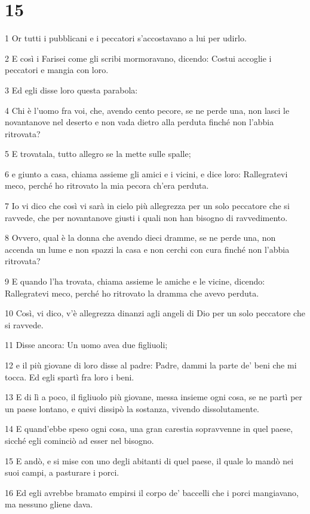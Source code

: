 \chapter{15}

\par 1 Or tutti i pubblicani e i peccatori s'accostavano a lui per udirlo.
\par 2 E così i Farisei come gli scribi mormoravano, dicendo: Costui accoglie i peccatori e mangia con loro.
\par 3 Ed egli disse loro questa parabola:
\par 4 Chi è l'uomo fra voi, che, avendo cento pecore, se ne perde una, non lasci le novantanove nel deserto e non vada dietro alla perduta finché non l'abbia ritrovata?
\par 5 E trovatala, tutto allegro se la mette sulle spalle;
\par 6 e giunto a casa, chiama assieme gli amici e i vicini, e dice loro: Rallegratevi meco, perché ho ritrovato la mia pecora ch'era perduta.
\par 7 Io vi dico che così vi sarà in cielo più allegrezza per un solo peccatore che si ravvede, che per novantanove giusti i quali non han bisogno di ravvedimento.
\par 8 Ovvero, qual è la donna che avendo dieci dramme, se ne perde una, non accenda un lume e non spazzi la casa e non cerchi con cura finché non l'abbia ritrovata?
\par 9 E quando l'ha trovata, chiama assieme le amiche e le vicine, dicendo: Rallegratevi meco, perché ho ritrovato la dramma che avevo perduta.
\par 10 Così, vi dico, v'è allegrezza dinanzi agli angeli di Dio per un solo peccatore che si ravvede.
\par 11 Disse ancora: Un uomo avea due figliuoli;
\par 12 e il più giovane di loro disse al padre: Padre, dammi la parte de' beni che mi tocca. Ed egli spartì fra loro i beni.
\par 13 E di lì a poco, il figliuolo più giovane, messa insieme ogni cosa, se ne partì per un paese lontano, e quivi dissipò la sostanza, vivendo dissolutamente.
\par 14 E quand'ebbe speso ogni cosa, una gran carestia sopravvenne in quel paese, sicché egli cominciò ad esser nel bisogno.
\par 15 E andò, e si mise con uno degli abitanti di quel paese, il quale lo mandò nei suoi campi, a pasturare i porci.
\par 16 Ed egli avrebbe bramato empirsi il corpo de' baccelli che i porci mangiavano, ma nessuno gliene dava.
